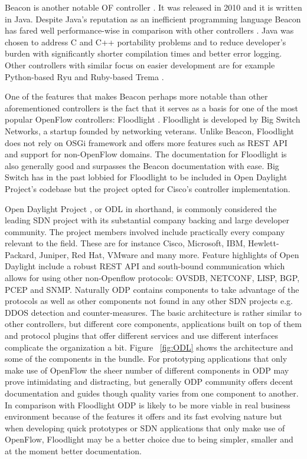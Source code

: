 	Beacon is another notable OF controller \cite{Beacon}. It was released in 2010 and it is written in Java. Despite Java’s reputation as an inefficient programming language Beacon has fared well performance-wise in comparison with other controllers \cite{Erickson13}. Java was chosen to address C and C++ portability problems and to reduce developer’s burden with significantly shorter compilation times and better error logging. Other controllers with similar focus on easier development are for example Python-based Ryu \cite{Ryu} and Ruby-based Trema \cite{Trema}.

One of the features that makes Beacon perhaps more notable than other aforementioned controllers is the fact that it serves as a basis for one of the most popular OpenFlow controllers: Floodlight \cite{Floodlight}. Floodlight is developed by Big Switch Networks, a startup founded by networking veterans. Unlike Beacon, Floodlight does not rely on OSGi framework and offers more features such as REST API and support for non-OpenFlow domains. The documentation for Floodlight is also generally good and surpasses the Beacon documentation with ease.
 Big Switch has in the past lobbied for Floodlight to be included in Open Daylight Project’s codebase \cite{BAN13} but the project opted for Cisco’s controller implementation. 

Open Daylight Project \cite{ODL}, or ODL in shorthand, is commonly considered the leading SDN project with its substantial company backing and large developer community. The project members involved include practically every company relevant to the field. These are for instance Cisco, Microsoft, IBM, Hewlett-Packard, Juniper, Red Hat, VMware and many more. Feature highlights of Open Daylight include a robust REST API and south-bound communication which allows for using other non-Openflow protocols: OVSDB, NETCONF, LISP, BGP, PCEP and SNMP. Naturally ODP contains components to take advantage of the protocols as well as other components not found in any other SDN projects e.g. DDOS detection and counter-measures. The basic architecture is rather similar to other controllers, but different core components, applications built on top of them and protocol plugins that offer different services and use different interfaces complicate the organization a bit. Figure ~\ref{fig:ODL} shows the architecture and some of the components in the bundle. For prototyping applications that only make use of OpenFlow the sheer number of different components in ODP may prove intimidating and distracting, but generally ODP community offers decent documentation and guides though quality varies from one component to another. In comparison with Floodlight ODP is likely to be more viable in real business environment because of the features it offers and its fast evolving nature but when developing quick prototypes or SDN applications that only make use of OpenFlow, Floodlight may be a better choice due to being simpler, smaller and at the moment better documentation.

